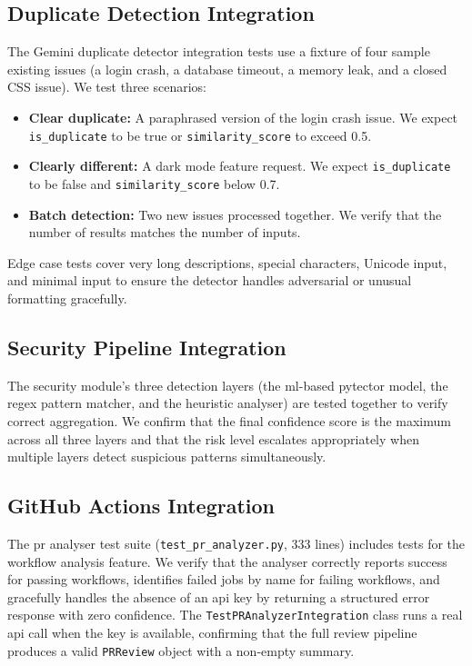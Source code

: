\subsection{Duplicate Detection Integration}

The Gemini duplicate detector integration tests use a fixture of four sample existing issues (a login crash, a database timeout, a memory leak, and a closed CSS issue). We test three scenarios:

\begin{itemize}
\item \textbf{Clear duplicate:} A paraphrased version of the login crash issue. We expect \texttt{is\_duplicate} to be true or \texttt{similarity\_score} to exceed 0.5.
\item \textbf{Clearly different:} A dark mode feature request. We expect \texttt{is\_duplicate} to be false and \texttt{similarity\_score} below 0.7.
\item \textbf{Batch detection:} Two new issues processed together. We verify that the number of results matches the number of inputs.
\end{itemize}

Edge case tests cover very long descriptions, special characters, Unicode input, and minimal input to ensure the detector handles adversarial or unusual formatting gracefully.

\subsection{Security Pipeline Integration}

The security module's three detection layers (the \gls{ml}-based pytector model, the regex pattern matcher, and the heuristic analyser) are tested together to verify correct aggregation. We confirm that the final confidence score is the maximum across all three layers and that the risk level escalates appropriately when multiple layers detect suspicious patterns simultaneously.

\subsection{GitHub Actions Integration}

The \gls{pr} analyser test suite (\texttt{test\_pr\_analyzer.py}, 333 lines) includes tests for the workflow analysis feature. We verify that the analyser correctly reports success for passing workflows, identifies failed jobs by name for failing workflows, and gracefully handles the absence of an \gls{api} key by returning a structured error response with zero confidence. The \texttt{TestPRAnalyzerIntegration} class runs a real \gls{api} call when the key is available, confirming that the full review pipeline produces a valid \texttt{PRReview} object with a non-empty summary.

